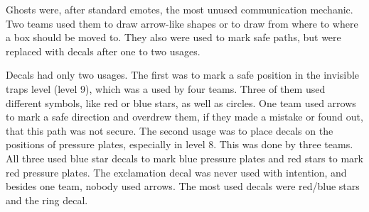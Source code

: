 Ghosts were, after standard emotes, the most unused communication mechanic. Two teams used them to draw arrow-like shapes or to draw from where to where a box should be moved to. They also were used to mark safe paths, but were replaced with decals after one to two usages.

Decals had only two usages. The first was to mark a safe position in the invisible traps level (level 9), which was a used by four teams. Three of them used different symbols, like red or blue stars, as well as circles. One team used arrows to mark a safe direction and overdrew them, if they made a mistake or found out, that this path was not secure.
The second usage was to place decals on the positions of pressure plates, especially in level 8. This was done by three teams. All three used blue star decals to mark blue pressure plates and red stars to mark red pressure plates. The exclamation decal was never used with intention, and besides one team, nobody used arrows. The most used decals were red/blue stars and the ring decal.